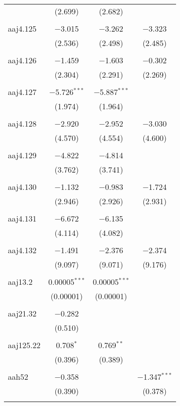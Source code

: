 \begin{table}[!htbp]
\begin{tabular}{@{\extracolsep{5pt}}lccc}
  & (2.699) & (2.682) &  \\ 
  & & & \\ 
 aaj4.125 & $-$3.015 & $-$3.262 & $-$3.323 \\ 
  & (2.536) & (2.498) & (2.485) \\ 
  & & & \\ 
 aaj4.126 & $-$1.459 & $-$1.603 & $-$0.302 \\ 
  & (2.304) & (2.291) & (2.269) \\ 
  & & & \\ 
 aaj4.127 & $-$5.726$^{***}$ & $-$5.887$^{***}$ &  \\ 
  & (1.974) & (1.964) &  \\ 
  & & & \\ 
 aaj4.128 & $-$2.920 & $-$2.952 & $-$3.030 \\ 
  & (4.570) & (4.554) & (4.600) \\ 
  & & & \\ 
 aaj4.129 & $-$4.822 & $-$4.814 &  \\ 
  & (3.762) & (3.741) &  \\ 
  & & & \\ 
 aaj4.130 & $-$1.132 & $-$0.983 & $-$1.724 \\ 
  & (2.946) & (2.926) & (2.931) \\ 
  & & & \\ 
 aaj4.131 & $-$6.672 & $-$6.135 &  \\ 
  & (4.114) & (4.082) &  \\ 
  & & & \\ 
 aaj4.132 & $-$1.491 & $-$2.376 & $-$2.374 \\ 
  & (9.097) & (9.071) & (9.176) \\ 
  & & & \\ 
 aaj13.2 & 0.00005$^{***}$ & 0.00005$^{***}$ &  \\ 
  & (0.00001) & (0.00001) &  \\ 
  & & & \\ 
 aaj21.32 & $-$0.282 &  &  \\ 
  & (0.510) &  &  \\ 
  & & & \\ 
 aaj125.22 & 0.708$^{*}$ & 0.769$^{**}$ &  \\ 
  & (0.396) & (0.389) &  \\ 
  & & & \\ 
 aah52 & $-$0.358 &  & $-$1.347$^{***}$ \\ 
  & (0.390) &  & (0.378) \\ 
  & & & \\ 

\end{tabular}
\end{table}
